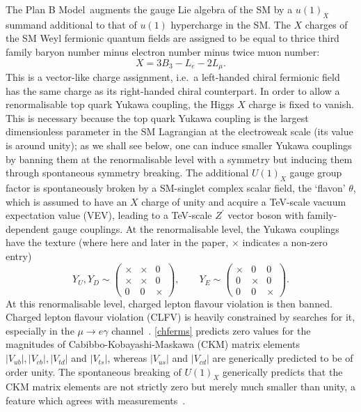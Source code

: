 \documentclass[11pt,letterpaper]{article}
\newcommand{\model}{Plan B Model}
\begin{document}
The \model\ augments the gauge Lie algebra of the SM by a $u(1)_X$ summand additional to that of $u(1)$ hypercharge in the SM\@. The $X$ charges of the SM Weyl fermionic quantum fields are assigned to be equal to thrice third family baryon number minus electron number minus twice muon number:
\begin{equation}
X = 3B_3-L_e-2L_\mu.    
\end{equation}
This is a vector-like charge assignment, i.e.\ a left-handed chiral fermionic field has the same charge as its right-handed chiral counterpart. 
In order to allow a renormalisable top quark Yukawa coupling, the Higgs $X$
charge is fixed to vanish. This is necessary because the top quark Yukawa
coupling is the largest dimensionless parameter in the SM Lagrangian at the
electroweak scale (its value is around unity); as we shall see below, one can induce
smaller Yukawa couplings by banning them at the renormalisable level with a
symmetry but inducing them through spontaneous symmetry breaking. The
additional $U(1)_X$ gauge group factor is spontaneously broken by a SM-singlet
complex scalar 
field, the `flavon' $\theta$, which is assumed to have an $X$ charge of unity
and acquire a TeV-scale vacuum expectation value (VEV), leading to a TeV-scale
$Z^\prime$ vector boson with family-dependent gauge couplings. At the
renormalisable level, the  Yukawa couplings have the texture (where here and
later in the paper, $\times$ indicates a non-zero entry)
\begin{equation}
    Y_U , Y_D \sim \begin{pmatrix}
    \times & \times & 0 \\
        \times & \times & 0 \\      
        0 & 0 & \times
    \end{pmatrix}, \qquad
    Y_E \sim \begin{pmatrix}
    \times & 0 & 0 \\
        0& \times & 0 \\      
        0 & 0 & \times
    \end{pmatrix}. \label{chferms}
\end{equation}
At this renormalisable level, charged lepton flavour violation is then banned. 
Charged lepton flavour violation (CLFV) is heavily constrained by searches for it, especially in the $\mu \rightarrow e \gamma$ channel~\cite{MEGII:2023ltw}.
\cref{chferms} predicts zero values for the magnitudes of
Cabibbo-Kobayashi-Maskawa (CKM) matrix elements $|V_{ub}|,|V_{cb}|,|V_{td}|$
and $|V_{ts}|$, whereas $|V_{us}|$ and $|V_{cd}|$ are generically predicted to
be of order unity. The spontaneous breaking of $U(1)_X$  generically
predicts that
the CKM matrix elements are not strictly zero but merely much smaller than unity, a feature which agrees with measurements~\cite{PDG}. 
\end{document}
